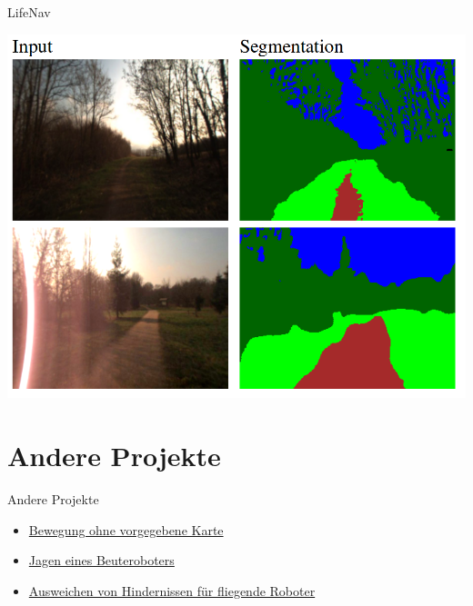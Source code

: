 \documentclass[aspectratio=1610]{beamer}
\begin{document}
  \begin{frame}{LifeNav}
  	\begin{center}
  		\includegraphics[scale=0.26]{img/segmentation.png}
  	\end{center}
  \end{frame}
  
  \section{Andere Projekte}
  \begin{frame}{Andere Projekte}
  	\begin{itemize}
  		\item \href{https://youtu.be/9AOIwBYIBbs?t=70}{Bewegung ohne vorgegebene Karte}
  		\item \href{https://www.youtube.com/watch?v=fL3YCIPxuhM&feature=youtu.be}{Jagen eines Beuteroboters}
  		\item \href{https://youtu.be/hNsP6-K3Hn4?t=40}{Ausweichen von Hindernissen für fliegende Roboter}
  	\end{itemize}
  \end{frame}
  
\end{document}
